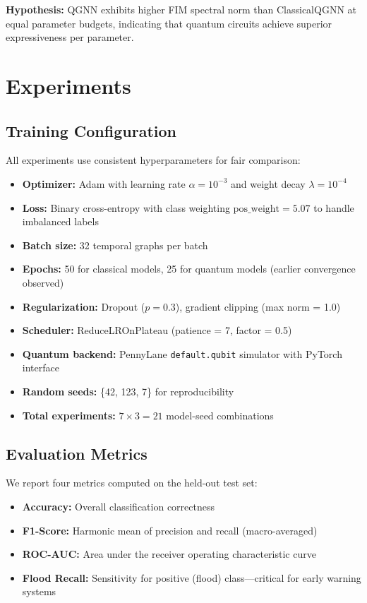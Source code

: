 \documentclass[conference]{IEEEtran}
\begin{document}
\noindent\textbf{Hypothesis:} QGNN exhibits higher FIM spectral norm than ClassicalQGNN at equal parameter budgets, indicating that quantum circuits achieve superior expressiveness per parameter.

\section{Experiments}
\label{sec:experiments}

\subsection{Training Configuration}

All experiments use consistent hyperparameters for fair comparison:

\begin{itemize}
\item \textbf{Optimizer:} Adam with learning rate $\alpha = 10^{-3}$ and weight decay $\lambda = 10^{-4}$
\item \textbf{Loss:} Binary cross-entropy with class weighting $\text{pos\_weight} = 5.07$ to handle imbalanced labels
\item \textbf{Batch size:} 32 temporal graphs per batch
\item \textbf{Epochs:} 50 for classical models, 25 for quantum models (earlier convergence observed)
\item \textbf{Regularization:} Dropout ($p = 0.3$), gradient clipping (max norm = 1.0)
\item \textbf{Scheduler:} ReduceLROnPlateau (patience = 7, factor = 0.5)
\item \textbf{Quantum backend:} PennyLane \texttt{default.qubit} simulator with PyTorch interface
\item \textbf{Random seeds:} \{42, 123, 7\} for reproducibility
\item \textbf{Total experiments:} $7 \times 3 = 21$ model-seed combinations
\end{itemize}

\subsection{Evaluation Metrics}

We report four metrics computed on the held-out test set:
\begin{itemize}
\item \textbf{Accuracy:} Overall classification correctness
\item \textbf{F1-Score:} Harmonic mean of precision and recall (macro-averaged)
\item \textbf{ROC-AUC:} Area under the receiver operating characteristic curve
\item \textbf{Flood Recall:} Sensitivity for positive (flood) class---critical for early warning systems
\end{itemize}
\end{document}

